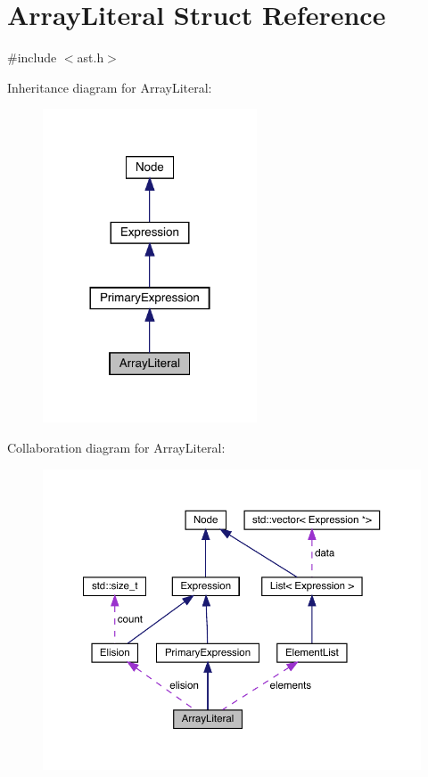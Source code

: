 \hypertarget{struct_array_literal}{}\section{Array\+Literal Struct Reference}
\label{struct_array_literal}


{\ttfamily \#include $<$ast.\+h$>$}



Inheritance diagram for Array\+Literal\+:
\nopagebreak
\begin{figure}[H]
\begin{center}
\leavevmode
\includegraphics[width=180pt]{struct_array_literal__inherit__graph}
\end{center}
\end{figure}


Collaboration diagram for Array\+Literal\+:
\nopagebreak
\begin{figure}[H]
\begin{center}
\leavevmode
\includegraphics[width=350pt]{struct_array_literal__coll__graph}
\end{center}
\end{figure}
